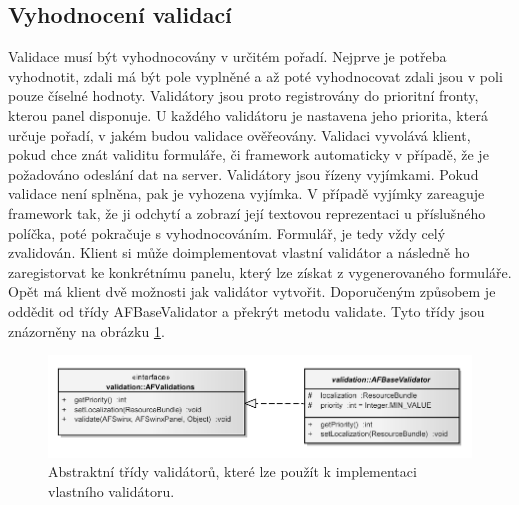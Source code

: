 \subsection{Vyhodnocení validací}
Validace musí být vyhodnocovány v určitém pořadí. Nejprve je potřeba vyhodnotit, zdali má být pole vyplněné a až poté vyhodnocovat zdali jsou v poli pouze číselné hodnoty. Validátory jsou proto registrovány do prioritní fronty, kterou panel disponuje. U každého validátoru je nastavena jeho priorita, která určuje pořadí, v jakém budou validace ověřeovány. Validaci vyvolává klient, pokud chce znát validitu formuláře, či framework automaticky v případě, že je požadováno odeslání dat na server. Validátory jsou řízeny vyjímkami. Pokud validace není splněna, pak je vyhozena vyjímka. V případě vyjímky zareaguje framework tak, že ji odchytí a zobrazí její textovou reprezentaci u příslušného políčka, poté pokračuje s vyhodnocováním. Formulář, je tedy vždy celý zvalidován. Klient si může doimplementovat vlastní validátor a následně ho zaregistorvat ke konkrétnímu panelu, který lze získat z vygenerovaného formuláře. Opět má klient dvě možnosti jak validátor vytvořit. Doporučeným způsobem je oddědit od třídy AFBaseValidator a překrýt metodu validate. Tyto třídy jsou znázorněny na obrázku \ref{img:validationModel}.
\begin{figure}[h!]
\includegraphics{images/validationModel}
\caption{Abstraktní třídy validátorů, které lze použít k implementaci vlastního validátoru.}
\label{img:validationModel}
\end{figure}

